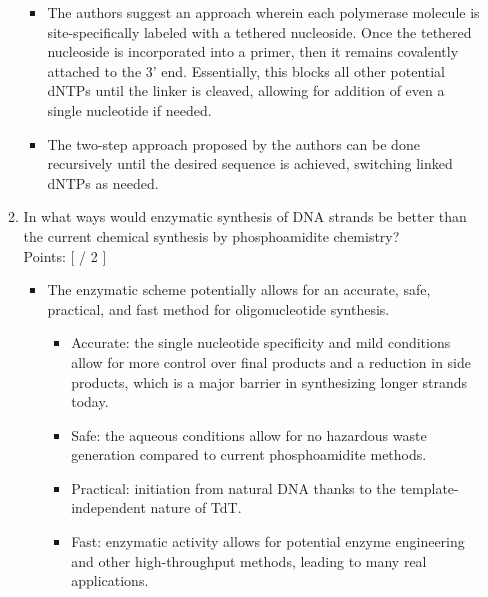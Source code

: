 \documentclass[basic]{inVerba-notes}
\begin{document}
\begin{enumerate}
\begin{enumerate}
    \begin{itemize}\color{text}
      \item The authors suggest an approach wherein each polymerase molecule is site-specifically labeled with a tethered nucleoside. Once the tethered nucleoside is incorporated into a primer, then it remains covalently attached to the 3' end. Essentially, this blocks all other potential dNTPs until the linker is cleaved, allowing for addition of even a single nucleotide if needed.
      \item The two-step approach proposed by the authors can be done recursively until the desired sequence is achieved, switching linked dNTPs as needed. 
    \end{itemize}
    \item In what ways would enzymatic synthesis of DNA strands be better than the current chemical synthesis by phosphoamidite chemistry? 
    \\ Points: [ \hspace{14pt} / 2 ] \smallskip

    \begin{itemize}\color{text}
      \item The enzymatic scheme potentially allows for an accurate, safe, practical, and fast method for oligonucleotide synthesis. 
        \begin{itemize}
          \item Accurate: the single nucleotide specificity and mild conditions allow for more control over final products and a reduction in side products, which is a major barrier in synthesizing longer strands today.
          \item Safe: the aqueous conditions allow for no hazardous waste generation compared to current phosphoamidite methods.
          \item Practical: initiation from natural DNA thanks to the template-independent nature of TdT.
          \item Fast: enzymatic activity allows for potential enzyme engineering and other high-throughput methods, leading to many real applications. 
        \end{itemize}
    \end{itemize}
  \end{enumerate}
\end{enumerate}
\end{document}
